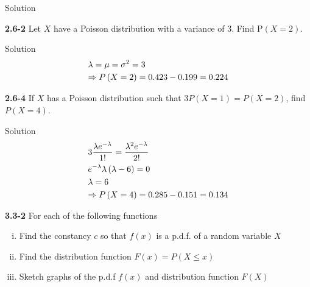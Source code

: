 \documentclass{article}
\begin{document}
\begin{spacing}{1.1}
\begin{homeworkProblem}
\begin{enumerate}[(a)]
\begin{homeworkSection}{Solution}
			\end{homeworkSection}
	\end{enumerate}
\end{homeworkProblem}
\begin{homeworkProblem}
	{\bf 2.6-2}	Let $X$ have a Poisson distribution with a variance of 3.  Find P$(X = 2)$.
	\begin{homeworkSection}{Solution}
		\[\begin{gathered}
  \lambda  = \mu  = {\sigma ^2} = 3 \hfill \\
   \Rightarrow P\left( {X = 2} \right) = 0.423 - 0.199 = 0.224 \hfill \\ 
\end{gathered} \]
	\end{homeworkSection}
\end{homeworkProblem}
\begin{homeworkProblem}
	{\bf 2.6-4}	If $X$ has a Poisson distribution such that $3P(X = 1) = P(X = 2)$, find $P(X = 4)$.
	\begin{homeworkSection}{Solution}
		\[\begin{gathered}
  3\frac{{\lambda {e^{ - \lambda }}}}{{1!}} = \frac{{{\lambda ^2}{e^{ - \lambda }}}}{{2!}} \hfill \\
  {e^{ - \lambda }}\lambda \left( {\lambda  - 6} \right) = 0 \hfill \\
  \lambda  = 6 \hfill \\
   \Rightarrow P\left( {X = 4} \right) = 0.285 - 0.151 = 0.134 \hfill \\ 
\end{gathered} \]
	\end{homeworkSection}
\end{homeworkProblem}
\begin{homeworkProblem}
	{\bf 3.3-2}	For each of the following functions
	\begin{enumerate}[(i)]
		\item Find the constancy $c$ so that $f(x)$ is a p.d.f. of a random variable $X$
		\item Find the distribution function $F(x) = P(X \le x)$
		\item Sketch graphs of the p.d.f $f(x)$ and distribution function $F(X)$
	\end{enumerate}
	\begin{enumerate}[(a)]

\end{enumerate}
\end{homeworkProblem}
\end{spacing}
\end{document}
